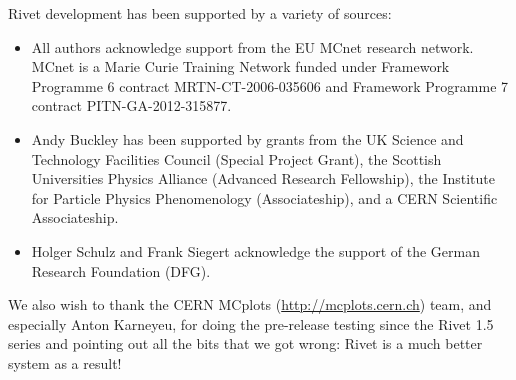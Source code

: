 Rivet development has been supported by a variety of sources:

\begin{itemize}
\item All authors acknowledge support from the EU MCnet research network. MCnet
  is a Marie Curie Training Network funded under Framework Programme 6
  contract MRTN-CT-2006-035606 and Framework Programme 7 contract PITN-GA-2012-315877.
\item Andy Buckley has been supported by grants from the UK Science and
  Technology Facilities Council (Special Project Grant), the Scottish
  Universities Physics Alliance (Advanced Research Fellowship), the Institute
  for Particle Physics Phenomenology (Associateship), and a CERN Scientific
  Associateship.
\item Holger Schulz and Frank Siegert acknowledge the support of the German
  Research Foundation (DFG).
\end{itemize}

We also wish to thank the CERN MCplots (\url{http://mcplots.cern.ch}) team, and
especially Anton Karneyeu, for doing the pre-release testing since the Rivet 1.5
series and pointing out all the bits that we got wrong: Rivet is a much better
system as a result!
